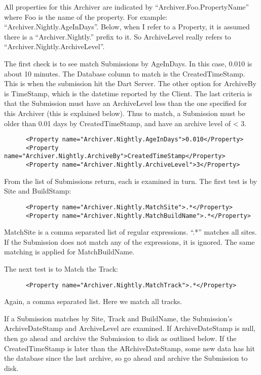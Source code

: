\documentclass{InsightBook}
\begin{document}
All properties for this Archiver are indicated by ``Archiver.Foo.PropertyName'' where Foo is the name of the property.  For example: ``Archiver.Nightly.AgeInDays''.  Below, when I refer to a Property, it is assumed there is a ``Archiver.Nightly.'' prefix to it.  So ArchiveLevel really refers to ``Archiver.Nightly.ArchiveLevel''.

The first check is to see match Submissions by AgeInDays.  In this
case, 0.010 is about 10 minutes.  The Database column to match is the
CreatedTimeStamp.  This is when the submission hit the Dart Server.
The other option for ArchiveBy is TimeStamp, which is the datetime
reported by the Client.  The last criteria is that the Submission must
have an ArchiveLevel less than the one specified for this Archiver
(this is explained below).  Thus to match, a Submission must be older
than 0.01 days by CreatedTimeStamp, and have an archive level of < 3.
\begin{verbatim}
      <Property name="Archiver.Nightly.AgeInDays">0.010</Property>
      <Property name="Archiver.Nightly.ArchiveBy">CreatedTimeStamp</Property>
      <Property name="Archiver.Nightly.ArchiveLevel">3</Property>
\end{verbatim}

From the list of Submissions return, each is examined in turn.  The
first test is by Site and BuildStamp:
\begin{verbatim}
      <Property name="Archiver.Nightly.MatchSite">.*</Property>
      <Property name="Archiver.Nightly.MatchBuildName">.*</Property>
\end{verbatim}

MatchSite is a comma separated list of regular expressions.  ``.*''
matches all sites.  If the Submission does not match any of the
expressions, it is ignored.  The same matching is applied for
MatchBuildName.

The next test is to Match the Track:
\begin{verbatim}
      <Property name="Archiver.Nightly.MatchTrack">.*</Property>
\end{verbatim}

Again, a comma separated list.  Here we match all tracks.

If a Submission matches by Site, Track and BuildName, the Submission's ArchiveDateStamp and ArchiveLevel are examined.  If ArchiveDateStamp is null, then go ahead and archive the Submission to disk as outlined below.  If the CreatedTimeStamp is later than the ARchiveDateStamp, some new data has hit the database since the last archive, so go ahead and archive the Submission to disk.
\end{document}
